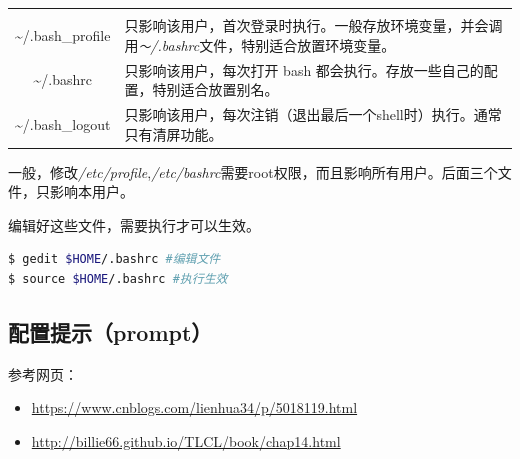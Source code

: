 \documentclass[doctor,openright,twoside]{sjtuthesis}
\providecommand{\tightlist}{%
    \setlength{\itemsep}{0pt}\setlength{\parskip}{0pt}}
\newcommand{\passthrough}[1]{#1}
\theoremstyle{plain}
\theoremstyle{definition}
\theoremstyle{remark}
\theoremstyle{ocrenumbox}
\theoremstyle{plain}
\begin{document}
\begin{longtable}[]{@{}cl@{}}
\begin{minipage}[t]{0.74\columnwidth}
\end{minipage}\tabularnewline
\begin{minipage}[t]{0.20\columnwidth}\centering
\textasciitilde/.bash\_profile\strut
\end{minipage} & \begin{minipage}[t]{0.74\columnwidth}\raggedright
只影响该用户，首次登录时执行。一般存放环境变量，并会调用\emph{\passthrough{\lstinline!～!}/.bashrc}文件，特别适合放置环境变量。\strut
\end{minipage}\tabularnewline
\begin{minipage}[t]{0.20\columnwidth}\centering
\textasciitilde/.bashrc\strut
\end{minipage} & \begin{minipage}[t]{0.74\columnwidth}\raggedright
只影响该用户，每次打开 bash 都会执行。存放一些自己的配置，特别适合放置别名。\strut
\end{minipage}\tabularnewline
\begin{minipage}[t]{0.20\columnwidth}\centering
\textasciitilde/.bash\_logout\strut
\end{minipage} & \begin{minipage}[t]{0.74\columnwidth}\raggedright
只影响该用户，每次注销（退出最后一个shell时）执行。通常只有清屏功能。\strut
\end{minipage}\tabularnewline
\bottomrule
\end{longtable}

一般，修改\emph{/etc/profile},\emph{/etc/bashrc}需要root权限，而且影响所有用户。后面三个文件，只影响本用户。

编辑好这些文件，需要执行才可以生效。

\begin{lstlisting}[language=bash]
$ gedit $HOME/.bashrc #编辑文件
$ source $HOME/.bashrc #执行生效
\end{lstlisting}

\hypertarget{prompt}{%
\subsection{配置提示（prompt）}\label{prompt}}

参考网页：

\begin{itemize}
\tightlist
\item
  \url{https://www.cnblogs.com/lienhua34/p/5018119.html}
\item
  \url{http://billie66.github.io/TLCL/book/chap14.html}
\end{itemize}
\end{document}
